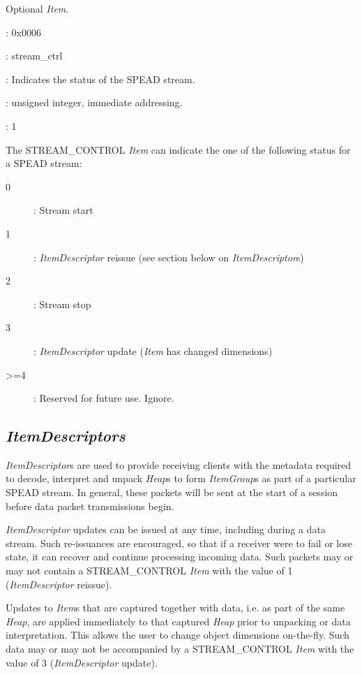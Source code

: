 \documentclass[11pt,english,twoside]{article}
\begin{document}
Optional \emph{Item}.

\begin{description}
\setlength{\itemindent}{0.5cm}
\setlength{\itemsep}{0ex plus0.2ex}
\item[Numerical Identifier]: 0x0006
\item[Name]: stream\_ctrl
\item[Description]: Indicates the status of the SPEAD stream.
\item[Type]: unsigned integer, immediate addressing.
\item[Shape]: 1
\end{description}

The STREAM\_CONTROL \emph{Item} can indicate the one of the following status for a SPEAD stream:

\begin{description}
\item[0]:   Stream start
\item[1]:   \emph{ItemDescriptor} reissue (see section below on \emph{ItemDescriptor}s)
\item[2]:   Stream stop
\item[3]:   \emph{ItemDescriptor} update (\emph{Item} has changed dimensions)
\item[>=4]: Reserved for future use. Ignore.
\end{description}


\subsection{\emph{ItemDescriptors}}

\emph{ItemDescriptor}s are used to provide receiving clients with the metadata required to decode, interpret and unpack \emph{Heap}s to form
\emph{ItemGroup}s as part of a particular SPEAD stream. In general, these packets will be sent at the start of a session before data packet
transmissions begin.

\emph{ItemDescriptor} updates can be issued at any time, including during a data stream. Such re-issuances are encouraged, so that if a receiver
were to fail or lose state, it can recover and continue processing incoming data. Such packets may or may not contain a STREAM\_CONTROL
\emph{Item} with the value of 1 (\emph{ItemDescriptor} reissue).

Updates to \emph{Item}s that are captured together with data, i.e. as part of the same \emph{Heap}, are applied immediately to that captured
\emph{Heap} prior to unpacking or data interpretation. This allows the user to change object dimensions on-the-fly. Such data may or may not be
accompanied by a STREAM\_CONTROL \emph{Item} with the value of 3 (\emph{ItemDescriptor} update).
\end{document}
